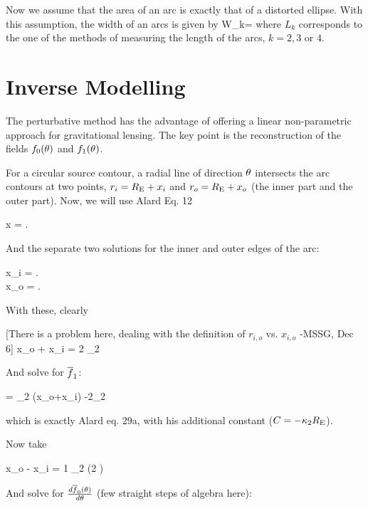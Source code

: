 Now we assume that the area of an arc is exactly that of a distorted
ellipse. With this assumption, the width of an arcs is given by
\beq
W_k=
\eeq
where $L_k$ corresponds to the one of the methods of measuring the length of the
arcs, $k=2,3$ or
$4$. 


\section{Inverse Modelling}

The perturbative method has the advantage of offering a linear non-parametric
approach for gravitational lensing. The key point is the reconstruction of the
fields $f_0(\theta)$ and $f_1(\theta)$.


For a circular source contour, a radial line of direction $\theta$ intersects
the arc contours at two points, $r_i=R_{\mathrm{E}}+x_i$ and $r_o=R_{\mathrm{E}}+x_o$ (the inner part
and
the outer part). Now, we will use Alard Eq. 12

\beq
x = . \;\;\;
\eeq

And the separate two solutions for the inner and outer edges of the arc:


\bea
x_i = . \;\;\;  \\
x_o = . \;\;\;
\eea


With these, clearly

[There is a problem here, dealing with the definition of $r_{i,o}$ vs. $x_{i,o}$
-MSSG, Dec 6]
\beq
x_o + x_i  = {2 \over \kappa_2} \re
\eeq

And solve for $\overline{f}_1$:


\beq
\fbar = {\kappa_2 } (x_o+x_i) -2\kappa_2 \re
\eeq

which is exactly Alard eq. 29a, with his additional constant ($C=-\kappa_2R_{\mathrm{E}}$).

Now take

\beq
x_o - x_i = {1 \over \kappa_2} \left(2 \right)
\eeq

And solve for ${d \overline{f}_0(\theta) \over d \theta}$ (few straight steps of algebra here):

